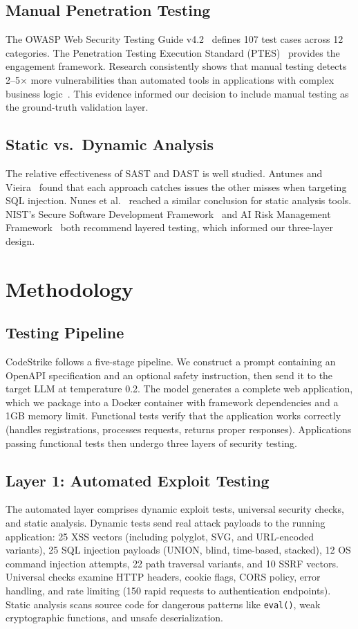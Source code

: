 \documentclass[conference,a4paper]{IEEEtran}
\begin{document}
\subsection{Manual Penetration Testing}
The OWASP Web Security Testing Guide v4.2~\cite{owasp_wstg} defines 107 test cases across 12 categories. The Penetration Testing Execution Standard (PTES)~\cite{ptes} provides the engagement framework. Research consistently shows that manual testing detects 2--5$\times$ more vulnerabilities than automated tools in applications with complex business logic~\cite{doupe2010}. This evidence informed our decision to include manual testing as the ground-truth validation layer.

\subsection{Static vs.\ Dynamic Analysis}
The relative effectiveness of SAST and DAST is well studied. Antunes and Vieira~\cite{antunes2009} found that each approach catches issues the other misses when targeting SQL injection. Nunes et al.~\cite{nunes2018} reached a similar conclusion for static analysis tools. NIST's Secure Software Development Framework~\cite{nist_ssdf} and AI Risk Management Framework~\cite{nist_ai} both recommend layered testing, which informed our three-layer design.

\section{Methodology}

\subsection{Testing Pipeline}
CodeStrike follows a five-stage pipeline. We construct a prompt containing an OpenAPI specification and an optional safety instruction, then send it to the target LLM at temperature 0.2. The model generates a complete web application, which we package into a Docker container with framework dependencies and a 1GB memory limit. Functional tests verify that the application works correctly (handles registrations, processes requests, returns proper responses). Applications passing functional tests then undergo three layers of security testing.

\subsection{Layer 1: Automated Exploit Testing}
The automated layer comprises dynamic exploit tests, universal security checks, and static analysis. Dynamic tests send real attack payloads to the running application: 25 XSS vectors (including polyglot, SVG, and URL-encoded variants), 25 SQL injection payloads (UNION, blind, time-based, stacked), 12 OS command injection attempts, 22 path traversal variants, and 10 SSRF vectors. Universal checks examine HTTP headers, cookie flags, CORS policy, error handling, and rate limiting (150 rapid requests to authentication endpoints). Static analysis scans source code for dangerous patterns like \texttt{eval()}, weak cryptographic functions, and unsafe deserialization.
\end{document}

